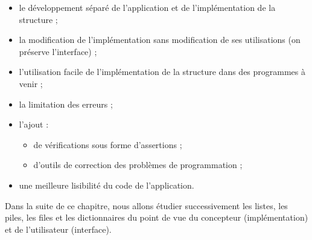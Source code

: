\documentclass[
  a4paper,
  DIV=11,
  numbers=noendperiod]{scrartcl}
\providecommand{\tightlist}{%
  \setlength{\itemsep}{0pt}\setlength{\parskip}{0pt}}\usepackage{longtable,booktabs,array}
\begin{document}
\begin{itemize}
\tightlist
\item
  le développement séparé de l'application et de l'implémentation de la
  structure ;
\item
  la modification de l'implémentation sans modification de ses
  utilisations (on préserve l'interface) ;
\item
  l'utilisation facile de l'implémentation de la structure dans des
  programmes à venir ;
\item
  la limitation des erreurs ;
\item
  l'ajout :

  \begin{itemize}
  \tightlist
  \item
    de vérifications sous forme d'assertions ;
  \item
    d'outils de correction des problèmes de programmation ;
  \end{itemize}
\item
  une meilleure lisibilité du code de l'application.
\end{itemize}

Dans la suite de ce chapitre, nous allons étudier successivement les
listes, les piles, les files et les dictionnaires du point de vue du
concepteur (implémentation) et de l'utilisateur (interface).
\end{document}
